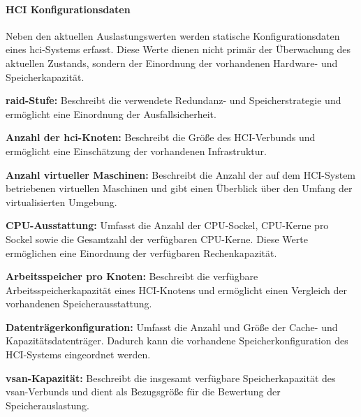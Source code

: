 \paragraph{HCI Konfigurationsdaten}
\label{par:hci-configurationdata}

Neben den aktuellen Auslastungswerten werden statische
Konfigurationsdaten eines \gls{hci}-Systems erfasst. Diese Werte dienen
nicht primär der Überwachung des aktuellen Zustands, sondern der
Einordnung der vorhandenen Hardware- und Speicherkapazität.

\begin{compactitem}

    \item \textbf{\gls{raid}-Stufe:} Beschreibt die verwendete
    Redundanz- und Speicherstrategie und ermöglicht eine Einordnung
    der Ausfallsicherheit.

    \item \textbf{Anzahl der \gls{hci}-Knoten:} Beschreibt die Größe
    des HCI-Verbunds und ermöglicht eine Einschätzung der vorhandenen
    Infrastruktur.

    \item \textbf{Anzahl virtueller Maschinen:} Beschreibt die Anzahl
    der auf dem HCI-System betriebenen virtuellen Maschinen und gibt
    einen Überblick über den Umfang der virtualisierten Umgebung.

    \item \textbf{CPU-Ausstattung:} Umfasst die Anzahl der CPU-Sockel,
    CPU-Kerne pro Sockel sowie die Gesamtzahl der verfügbaren
    CPU-Kerne. Diese Werte ermöglichen eine Einordnung der verfügbaren
    Rechenkapazität.

    \item \textbf{Arbeitsspeicher pro Knoten:} Beschreibt die verfügbare
    Arbeitsspeicherkapazität eines HCI-Knotens und ermöglicht einen
    Vergleich der vorhandenen Speicherausstattung.

    \item \textbf{Datenträgerkonfiguration:} Umfasst die Anzahl und
    Größe der Cache- und Kapazitätsdatenträger. Dadurch kann die
    vorhandene Speicherkonfiguration des HCI-Systems eingeordnet
    werden.

    \item \textbf{\gls{vsan}-Kapazität:} Beschreibt die insgesamt
    verfügbare Speicherkapazität des \gls{vsan}-Verbunds und dient
    als Bezugsgröße für die Bewertung der Speicherauslastung.

\end{compactitem}

